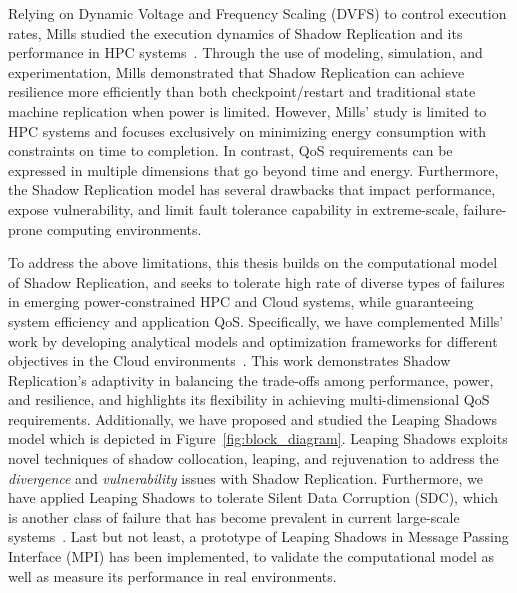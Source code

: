 Relying on Dynamic Voltage and Frequency Scaling (DVFS) to control execution rates, 
Mills studied the execution dynamics of Shadow Replication and its performance in HPC systems~\cite{mills_2014_icnc,mills_2014_pdp,mills2014power}. Through the use of modeling, simulation, and experimentation, Mills demonstrated that Shadow Replication can achieve resilience more efficiently than both checkpoint/restart and traditional state machine replication when power is limited. %
However, Mills' study is limited to HPC systems and focuses exclusively on minimizing energy consumption with constraints on time to completion. In contrast, QoS requirements can be expressed in multiple dimensions that go beyond time and energy. Furthermore, the Shadow Replication model has several drawbacks that impact performance, expose vulnerability, and limit fault tolerance capability in extreme-scale, failure-prone computing environments.

To address the above limitations, this thesis builds on the computational model of Shadow Replication, and seeks to tolerate high rate of diverse types of failures in emerging power-constrained HPC and Cloud systems, while guaranteeing system efficiency and application QoS.
Specifically, we have complemented Mills' work by developing analytical models and optimization frameworks for different objectives in the Cloud environments~\cite{cui_2014_closer}. This work demonstrates Shadow Replication's adaptivity in balancing the trade-offs among performance, power, and resilience, and highlights its flexibility in achieving multi-dimensional QoS requirements. Additionally, we have proposed and studied the Leaping Shadows model which is depicted in Figure~\ref{fig:block_diagram}. Leaping Shadows  exploits novel techniques of shadow collocation, leaping, and rejuvenation to address the \textit{divergence} and \textit{vulnerability} issues with Shadow Replication. Furthermore, we have applied Leaping Shadows to tolerate Silent Data Corruption (SDC), which is another class of failure that has become prevalent in current large-scale systems~\cite{fiala_2012_sdc}. Last but not least, a prototype of Leaping Shadows in Message Passing Interface (MPI) has been implemented, to validate the computational model as well as measure its performance in real environments. 


